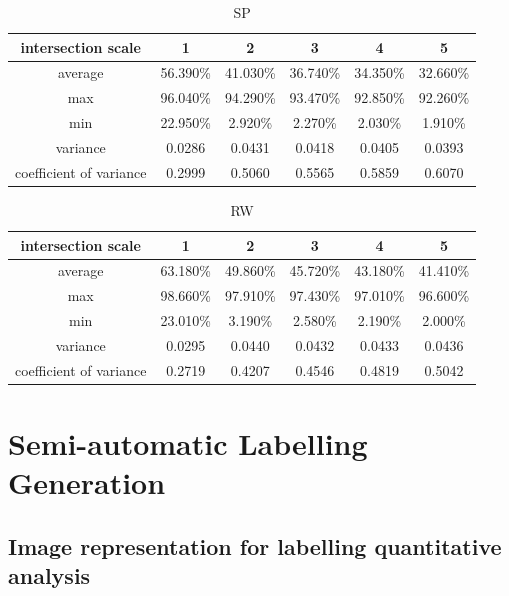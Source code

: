 \documentclass[runningheads,a4paper]{llncs}
\begin{document}
\begin{table}
\centering
\begin{tabular}{|c|c|c|c|c|c|}
\hline
intersection scale & 1 & 2 & 3 & 4& 5 \\
\hline
average& 56.390\% & 41.030\% & 36.740\% & 34.350\%& 32.660\% \\
\hline
max& 96.040\% & 94.290\% & 93.470\% & 92.850\%& 92.260\% \\
\hline
min& 22.950\% & 2.920\% & 2.270\% & 2.030\%& 1.910\%\\
\hline
variance& 0.0286 & 0.0431 & 0.0418& 0.0405&0.0393 \\
\hline
coefficient of variance& 0.2999 & 0.5060 & 0.5565 & 0.5859& 0.6070\\
\hline
\end{tabular}
\caption{SP}
\label{ta:sp intersection}
\end{table}

\begin{table}
\centering
\begin{tabular}{|c|c|c|c|c|c|}
\hline
intersection scale & 1 & 2 & 3 & 4& 5 \\
\hline
average& 63.180\% & 49.860\% & 45.720\% & 43.180\%& 41.410\% \\
\hline
max& 98.660\% & 97.910\% & 97.430\% & 97.010\%& 96.600\% \\
\hline
min& 23.010\% & 3.190\% & 2.580\% & 2.190\%& 2.000\%\\
\hline
variance& 0.0295 & 0.0440 & 0.0432 & 0.0433& 0.0436 \\
\hline
coefficient of variance& 0.2719 & 0.4207 & 0.4546 & 0.4819& 0.5042\\
\hline
\end{tabular}
\caption{RW}
\label{ta:rw intersection}
\end{table}


\section{Semi-automatic Labelling Generation}

\subsection{Image representation for labelling quantitative analysis}
\end{document}
